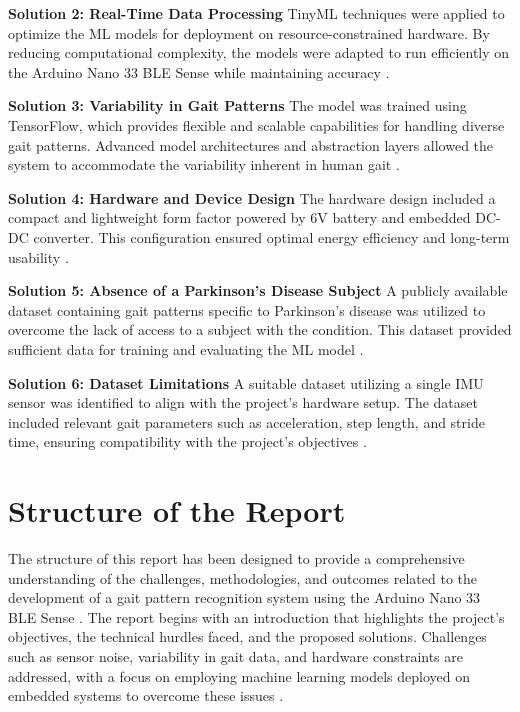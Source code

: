 \textbf{Solution 2: Real-Time Data Processing}  
TinyML techniques were applied to optimize the ML models for deployment on resource-constrained hardware. By reducing computational complexity, the models were adapted to run efficiently on the Arduino Nano 33 BLE Sense while maintaining accuracy \cite{David:2021, Abbas:2023}.

\textbf{Solution 3: Variability in Gait Patterns}  
The model was trained using TensorFlow, which provides flexible and scalable capabilities for handling diverse gait patterns. Advanced model architectures and abstraction layers allowed the system to accommodate the variability inherent in human gait \cite{Kumari2024}.

\textbf{Solution 4: Hardware and Device Design}  
The hardware design included a compact and lightweight form factor powered by 6V battery and embedded DC-DC converter. This configuration ensured optimal energy efficiency and long-term usability \cite{Tarduino:2020}.

\textbf{Solution 5: Absence of a Parkinson’s Disease Subject}  
A publicly available dataset containing gait patterns specific to Parkinson’s disease was utilized to overcome the lack of access to a subject with the condition. This dataset provided sufficient data for training and evaluating the ML model \cite{ZhangWenwen:2022}.

\textbf{Solution 6: Dataset Limitations}  
A suitable dataset utilizing a single IMU sensor was identified to align with the project’s hardware setup. The dataset included relevant gait parameters such as acceleration, step length, and stride time, ensuring compatibility with the project’s objectives \cite{Panebianco:2018}.

\section{Structure of the Report}

The structure of this report has been designed to provide a comprehensive understanding of the challenges, methodologies, and outcomes related to the development of a gait pattern recognition system using the Arduino Nano 33 BLE Sense . The report begins with an introduction that highlights the project's objectives, the technical hurdles faced, and the proposed solutions. Challenges such as sensor noise, variability in gait data, and hardware constraints are addressed, with a focus on employing machine learning models deployed on embedded systems to overcome these issues \cite{Kumari2024}.

